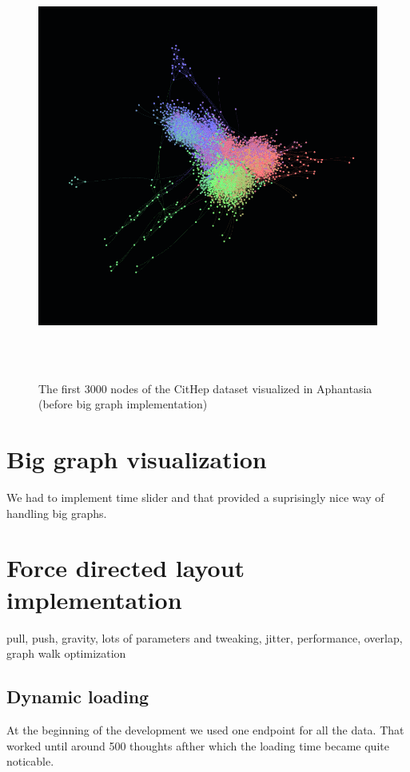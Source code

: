 \begin{figure}[p]\centering
    \includegraphics[width=140mm, height=140mm]{img/Afantazie_cithep_3000.png}
    \caption{The first 3000 nodes of the CitHep dataset visualized in Aphantasia (before big graph implementation)}
    \label{obr:afantazie_cithep_3k}
\end{figure}
  

\section{Big graph visualization}
We had to implement time slider and that provided a suprisingly nice way of handling big graphs.

\section{Force directed layout implementation}
pull, push, gravity, lots of parameters and tweaking, jitter, performance, overlap, graph walk optimization

\subsection{Dynamic loading}
At the beginning of the development we used one endpoint for all the data. That worked until around 500 thoughts afther which the loading time became quite noticable. 

